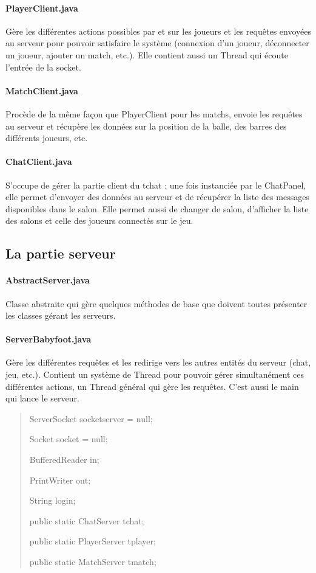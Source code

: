\documentclass[a4paper,12pt]{report}
\begin{document}
\paragraph{PlayerClient.java}
Gère les différentes actions possibles par et sur les joueurs et les requêtes envoyées au serveur pour pouvoir satisfaire le système (connexion d'un joueur, déconnecter un joueur, ajouter un match, etc.). Elle contient aussi un Thread qui écoute l'entrée de la socket.
\paragraph{MatchClient.java}
Procède de la même façon que PlayerClient pour les matchs, envoie les requêtes au serveur et récupère les données sur la position de la balle, des barres des différents joueurs, etc.
\paragraph{ChatClient.java}
S'occupe de gérer la partie client du tchat : une fois instanciée par le ChatPanel, elle permet d'envoyer des données au serveur et de récupérer la liste des messages disponibles dans le salon. Elle permet aussi de changer de salon, d'afficher la liste des salons et celle des joueurs connectés sur le jeu.
\subsection{La partie serveur}
\paragraph{AbstractServer.java}
Classe abstraite qui gère quelques méthodes de base que doivent toutes présenter les classes gérant les serveurs.
\paragraph{ServerBabyfoot.java}
Gère les différentes requêtes et les redirige vers les autres entités du serveur (chat, jeu, etc.). Contient un système de Thread pour pouvoir gérer simultanément ces différentes actions, un Thread général qui gère les requêtes. C'est aussi le main qui lance le serveur.
\begin{quote}
    ServerSocket socketserver = null;
    
	Socket socket = null;
    
	BufferedReader in;
    
	PrintWriter out;
    
	String login;
    
	public static ChatServer tchat;
    
	public static PlayerServer tplayer;
    
	public static MatchServer tmatch;
\end{quote}
\end{document}
